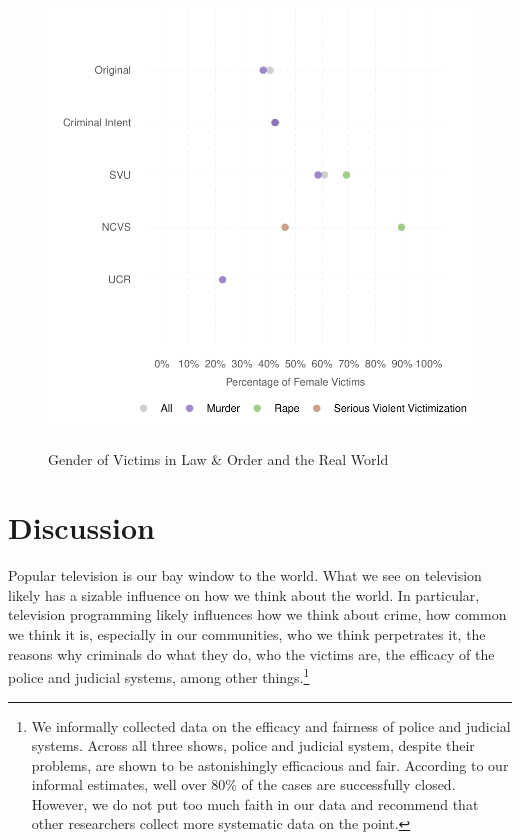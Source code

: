 \documentclass[12pt, letterpaper]{article}
\begin{document}
\begin{figure}[htbp]
\centering
\caption{Gender of Victims in Law \& Order and the Real World}
\includegraphics[scale=.9]{../figs/all_victims_by_gender.pdf}
\label{fig:victim_sex}
\end{figure}

\section*{Discussion}
Popular television is our bay window to the world. What we see on television likely has a sizable influence on how we think about the world. In particular, television programming likely influences how we think about crime, how common we think it is, especially in our communities, who we think perpetrates it, the reasons why criminals do what they do, who the victims are, the efficacy of the police and judicial systems, among other things.\footnote{We informally collected data on the efficacy and fairness of police and judicial systems. Across all three shows, police and judicial system, despite their problems, are shown to be astonishingly efficacious and fair. According to our informal estimates, well over 80\% of the cases are successfully closed. However, we do not put too much faith in our data and recommend that other researchers collect more systematic data on the point.} 
\end{document}
